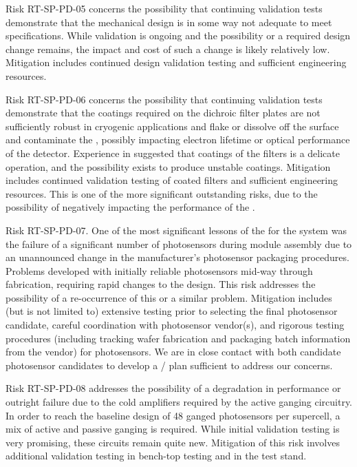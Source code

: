 Risk RT-SP-PD-05 concerns the possibility that continuing validation tests demonstrate that the  mechanical design is in some way not adequate to meet   specifications.  While validation is ongoing and the possibility or a required design change remains, the impact and cost of such a change is likely relatively low.  Mitigation includes continued design validation testing and sufficient engineering resources.

Risk RT-SP-PD-06 concerns the possibility that continuing validation tests demonstrate that the coatings required on the dichroic filter plates are not sufficiently robust in cryogenic applications and flake or dissolve off the surface and contaminate the , possibly impacting electron lifetime or optical performance of the detector.  Experience in  suggested that coatings of the filters is a delicate operation, and the possibility exists to produce unstable coatings.  Mitigation includes continued validation testing of coated filters and sufficient engineering resources.  This is one of the more significant outstanding risks, due to the possibility of negatively impacting the performance of the .

Risk RT-SP-PD-07.  One of the most significant lessons of the  for the  system was the failure of a significant number of photosensors during module assembly  due to an unannounced change in the manufacturer's photosensor packaging procedures.  Problems developed with initially reliable photosensors mid-way through fabrication, requiring rapid changes to the  design.  This risk addresses the possibility of a re-occurrence of this or a similar problem.  Mitigation includes (but is not limited to) extensive  testing prior to selecting the final photosensor candidate, careful coordination with photosensor vendor(s), and rigorous  testing procedures (including tracking wafer fabrication and packaging batch information from the vendor) for photosensors.  We are in close contact with both candidate photosensor candidates to develop a / plan sufficient to address our concerns.


Risk RT-SP-PD-08 addresses the possibility of a degradation in  performance or outright failure due to the cold amplifiers required by the active ganging circuitry.  In order to reach the baseline design of 48 ganged photosensors per  supercell, a mix of active and passive ganging is required.  While initial validation testing is very promising, these circuits remain quite new.  Mitigation of this risk involves additional validation testing in bench-top testing and in the  test stand.

